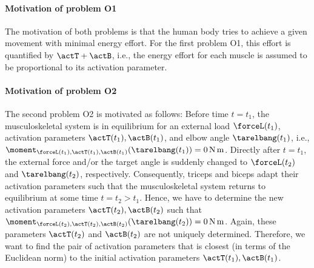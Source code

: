 \paragraph{Motivation of problem O1}

The motivation of both problems is that the human body tries to
achieve a given movement with minimal energy effort.
For the first problem O1, this effort is quantified by $\actT + \actB$,
i.e., the energy effort for each muscle is assumed to be proportional
to its activation parameter.

\paragraph{Motivation of problem O2}

The second problem O2 is motivated as follows:
Before time $t = t_1$, the musculoskeletal system is in equilibrium for
an external load $\forceL(t_1)$,
activation parameters $\actT(t_1), \actB(t_1)$, and
elbow angle $\tarelbang(t_1)$, i.e.,
$\moment_{\forceL(t_1),\actT(t_1),\actB(t_1)}(\tarelbang(t_1))
= \SI{0}{\newton\meter}$.
Directly after $t = t_1$,
the external force and/or the target angle is suddenly changed
to $\forceL(t_2)$ and $\tarelbang(t_2)$, respectively.
Consequently, triceps and biceps adapt their activation parameters
such that the musculoskeletal system returns to equilibrium
at some time $t = t_2 > t_1$.
Hence, we have to determine the new activation parameters
$\actT(t_2), \actB(t_2)$ such that
$\moment_{\forceL(t_2),\actT(t_2),\actB(t_2)}(\tarelbang(t_2))
= \SI{0}{\newton\meter}$.
Again, these parameters
$\actT(t_2)$ and $\actB(t_2)$ are not uniquely determined.
Therefore, we want to find the pair of activation parameters
that is closest (in terms of the Euclidean norm) to the initial
activation parameters $\actT(t_1), \actB(t_1)$.

%

